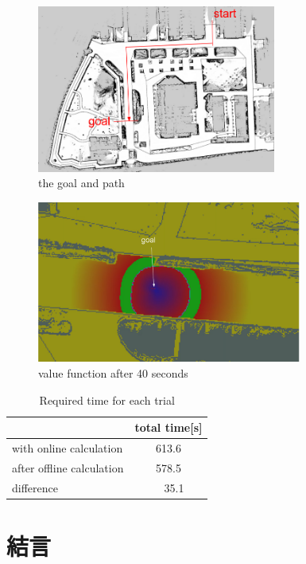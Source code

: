 \documentclass{jarticle}
\begin{document}
\begin{figure}[htb]
  \centering
   \includegraphics[height=55mm]{./figs/tsudanuma-long.png}
   \caption{the goal and path}
	\label{fig:tsudanuma-long-path}
\end{figure}

\begin{figure}[htb]
  \centering
   \includegraphics[height=53mm]{./figs/tsudanuma-long-value.png}
   \caption{value function after 40 seconds}
	\label{fig:value-function}
\end{figure}

\begin{table}[hbtp]
	\caption{Required time for each trial}
	\label{table:result2}
	\centering
	\begin{small}
	 \begin{tabular}{l|c}
		\hline
		 & total time[s] \\
		\hline \hline
		with online calculation & 613.6 \\
		after offline calculation & 578.5 \\
		\hline
		 difference & \ \ 35.1 \\
		\hline
	 \end{tabular}
	\end{small}
\end{table}

\section{結言}%
\end{document}
